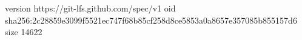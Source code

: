 version https://git-lfs.github.com/spec/v1
oid sha256:2c28859e3099f5521ec747f68b85cf258d8ce5853a0a8657e357085b855157d6
size 14622
